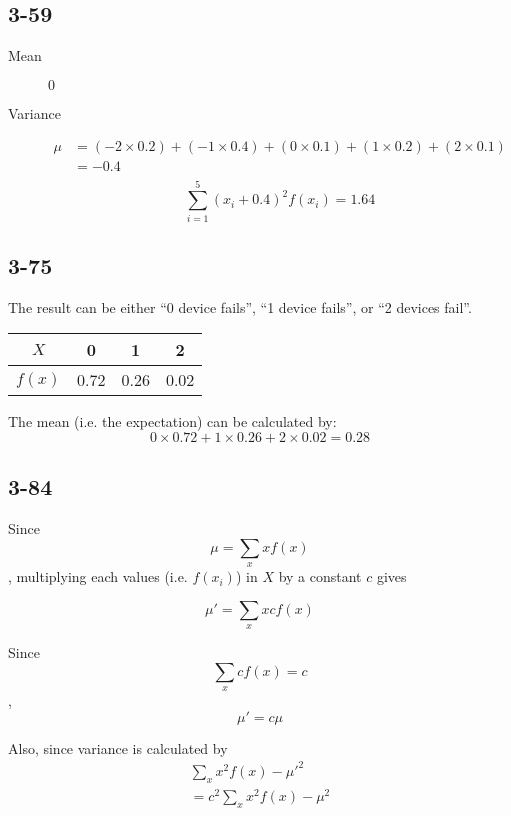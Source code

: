 \documentclass{article}
\begin{document}
\subsection*{3-59}
\begin{description}
    \item[Mean]
        $0$
    \item[Variance]
        \begin{equation*}
            \begin{aligned}
                \mu &= (-2 \times 0.2) + (-1 \times 0.4) + (0 \times 0.1) + (1 \times 0.2) + (2 \times 0.1) \\
                    &= -0.4 \\
            \end{aligned}
        \end{equation*}
        \begin{equation*}
            \sum_{i = 1}^{5} (x_i + 0.4)^2 f(x_i) = 1.64
        \end{equation*}
\end{description}
\subsection*{3-75}
The result can be either ``0 device fails'', ``1 device fails'', or ``2
devices fail''.

\begin{table}[h]
    \centering
    \begin{tabular}{|c|c|c|c|}
        \hline
        $X$ & 0 & 1 & 2 \\
        \hline
        $f(x)$ & 0.72 & 0.26 & 0.02 \\
        \hline
    \end{tabular}
\end{table}

The mean (i.e. the expectation) can be calculated by:
\[
    0 \times 0.72 + 1 \times 0.26 + 2 \times 0.02 = 0.28
\]

\subsection*{3-84}
Since
\[
    \mu = \sum_{x} xf(x)
\]
, multiplying each values (i.e. $f(x_i)$) in $X$ by a constant $c$ gives

\[
    \mu' = \sum_{x} xcf(x)
\]

Since
\[
    \sum_{x} cf(x) = c
\]
,
\[
    \mu' = c\mu
\]

Also, since variance is calculated by
\begin{equation*}
    \begin{aligned}
        \sum_{x} x^2f(x) - \mu'^2 \\
        = c^2 \sum_{x} x^2f(x) - \mu^2
    \end{aligned}
\end{equation*}
\end{document}
